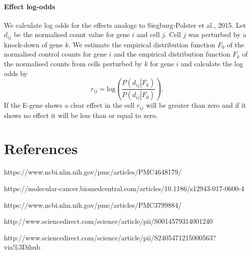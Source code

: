 \documentclass[12pt]{article}
\begin{document}
\paragraph{Effect log-odds}
We calculate log odds for the effects analoge to Siegburg-Polster et al., 2015. Let $d_{ij}$ be the normalised count value for gene $i$ and cell $j$. Cell $j$ was perturbed by a knock-down of gene $k$. We estimate the empirical distribution function $F_0$ of the normalised control counts for gene $i$ and the empirical distribution function $F_k$ of the normalised counts from cells perturbed by $k$ for gene $i$ and calculate the log odds by
\[r_{ij} = \mathrm{log} \left(\frac{P\left(d_{ij} \left|\right. F_k\right)}{P\left(d_{ij} \left|\right. F_0\right)}\right).\]
 If the E-gene shows a clear effect in the cell $r_{ij}$ will be greater than zero and if it shows no effect it will be less than or equal to zero.

\section{References}
https://www.ncbi.nlm.nih.gov/pmc/articles/PMC4648179/

https://molecular-cancer.biomedcentral.com/articles/10.1186/s12943-017-0600-4

https://www.ncbi.nlm.nih.gov/pmc/articles/PMC3799884/

http://www.sciencedirect.com/science/article/pii/S0014579314001240

http://www.sciencedirect.com/science/article/pii/S2405471215000563?via\%3Dihub
\end{document}
